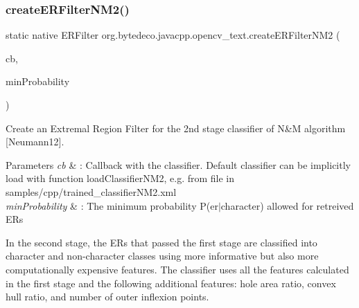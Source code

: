 \subsubsection{\texorpdfstring{create\+E\+R\+Filter\+N\+M2()}{createERFilterNM2()}}
{\footnotesize\ttfamily static native E\+R\+Filter org.\+bytedeco.\+javacpp.\+opencv\+\_\+text.\+create\+E\+R\+Filter\+N\+M2 (\begin{DoxyParamCaption}\item[{@Ptr E\+R\+Filter.\+Callback}]{cb,  }\item[{float}]{min\+Probability }\end{DoxyParamCaption})\hspace{0.3cm}{\ttfamily [static]}}



Create an Extremal Region Filter for the 2nd stage classifier of N\&M algorithm \mbox{[}Neumann12\mbox{]}. 


\begin{DoxyParams}{Parameters}
{\em cb} & \+: Callback with the classifier. Default classifier can be implicitly load with function load\+Classifier\+N\+M2, e.\+g. from file in samples/cpp/trained\+\_\+classifier\+N\+M2.\+xml \\
\hline
{\em min\+Probability} & \+: The minimum probability P(er$\vert$character) allowed for retreived ER\textquotesingle{}s \\
\hline
\end{DoxyParams}
In the second stage, the E\+Rs that passed the first stage are classified into character and non-\/character classes using more informative but also more computationally expensive features. The classifier uses all the features calculated in the first stage and the following additional features\+: hole area ratio, convex hull ratio, and number of outer inflexion points. \mbox{\label{group__text__detect_ga3198c558c08dac61bce863d430bf2da6}} 
